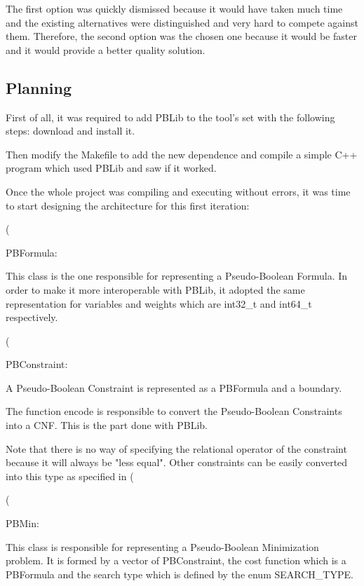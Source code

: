 The first option was quickly dismissed because it would have taken much time and the existing alternatives were distinguished and very hard to compete against them. Therefore, the second option was the chosen one because it would be faster and it would provide a better quality solution. 


\subsection{Planning}

First of all, it was required to add PBLib to the tool's set with the following steps: download and install it.  

Then modify the Makefile to add the new dependence and compile a simple C++ program which used PBLib and saw if it worked.  

Once the whole project was compiling and executing without errors, it was time to start designing the architecture for this first iteration: 



(%



PBFormula:  

This class is the one responsible for representing a Pseudo-Boolean Formula. In order to make it more interoperable with PBLib, it adopted the same representation for variables and weights which are int32\_t and int64\_t respectively.  

(%



PBConstraint: 

A Pseudo-Boolean Constraint is represented as a PBFormula and a boundary.  

The function encode is responsible to convert the Pseudo-Boolean Constraints into a CNF. This is the part done with PBLib. 

Note that there is no way of specifying the relational operator of the constraint because it will always be "less equal".  Other constraints can be easily converted into this type as specified in (%

(%



PBMin: 

This class is responsible for representing a Pseudo-Boolean Minimization problem.  It is formed by a vector of PBConstraint, the cost function which is a PBFormula and the search type which is defined by the enum SEARCH\_TYPE.  

